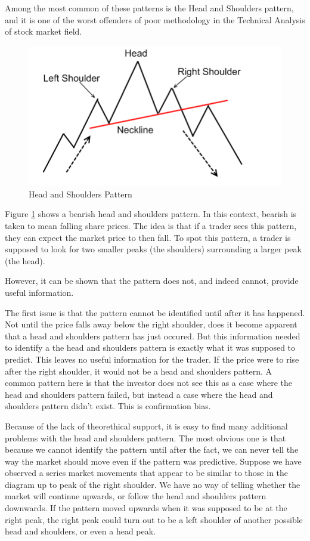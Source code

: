 \documentclass{report}
\begin{document}
Among the most common of these patterns is the Head and Shoulders pattern, and it is one of the worst offenders of poor methodology in the Technical Analysis of stock market field.

\begin{figure}[H]
	\caption{Head and Shoulders Pattern \cite{website:headshoulders}}
	\centerline{\includegraphics[width=\textwidth]{vis/headshoulders.png}}
	\label{fig:headshoulders}
\end{figure}

Figure \ref{fig:headshoulders} shows a bearish head and shoulders pattern. In this context, bearish is taken to mean falling share prices. The idea is that if a trader sees this pattern, they can expect the market price to then fall. To spot this pattern, a trader is supposed to look for two smaller peaks (the shoulders) surrounding a larger peak (the head). 

However, it can be shown that the pattern does not, and indeed cannot, provide useful information. 

The first issue is that the pattern cannot be identified until after it has happened. Not until the price falls away below the right shoulder, does it become apparent that a head and shoulders pattern has just occured. But this information needed to identify a the head and shoulders pattern is exactly what it was supposed to predict. This leaves no useful information for the trader. If the price were to rise after the right shoulder, it would not be a head and shoulders pattern. A common pattern here is that the investor does not see this as a case where the head and shoulders pattern failed, but instead a case where the head and shoulders pattern didn't exist. This is confirmation bias.

Because of the lack of theorethical support, it is easy to find many additional problems with the head and shoulders pattern. The most obvious one is that because we cannot identify the pattern until after the fact, we can never tell the way the market should move even if the pattern was predictive. Suppose we have observed a series market movements that appear to be similar to those in the diagram up to peak of the right shoulder. We have no way of telling whether the market will continue upwards, or follow the head and shoulders pattern downwards. If the pattern moved upwards when it was supposed to be at the right peak, the right peak could turn out to be a left shoulder of another possible head and shoulders, or even a head peak.
\end{document}
